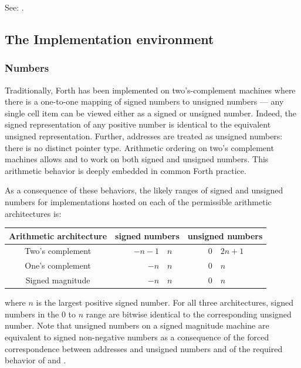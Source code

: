 See: .


\subsection{The Implementation environment} %

\subsubsection{Numbers} %

Traditionally, Forth has been implemented on two's-complement machines
where there is a one-to-one mapping of signed numbers to unsigned
numbers --- any single cell item can be viewed either as a signed or
unsigned number. Indeed, the signed representation of any positive
number is identical to the equivalent unsigned representation. Further,
addresses are treated as unsigned numbers: there is no distinct pointer
type. Arithmetic ordering on two's complement machines allows \word{+}
and \word{-} to work on both signed and unsigned numbers. This
arithmetic behavior is deeply embedded in common Forth practice.

As a consequence of these behaviors, the likely ranges of signed and
unsigned numbers for implementations hosted on each of the permissible
arithmetic architectures is:

\begin{center}
  \begin{tabular}{cr@{ to }llr@{ to }l}
	\hline\hline
	\textbf{Arithmetic architecture}
	&\multicolumn{2}{c}{\textbf{signed numbers}}
	&\multicolumn{3}{c}{\textbf{unsigned numbers}} \\
	\hline
	Two's complement	& $-n-1$ & $n$		&& $0$ & $2n+1$	\\
	One's complement	& $-n$ & $n$		&& $0$ & $n$		\\
	Signed magnitude	& $-n$ & $n$		&& $0$ & $n$		\\
	\hline\hline
  \end{tabular}
\end{center}

where $n$ is the largest positive signed number. For all three
architectures, signed numbers in the $0$ to $n$ range are bitwise
identical to the corresponding unsigned number. Note that unsigned
numbers on a signed magnitude machine are equivalent to signed
non-negative numbers as a consequence of the forced correspondence
between addresses and unsigned numbers and of the required behavior
of \word{+} and \word{-}.

